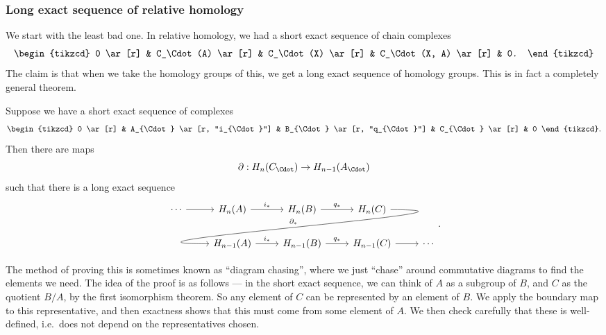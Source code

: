\documentclass[a4paper]{article}
\theoremstyle{definition}
\begin{document}
\subsubsection*{Long exact sequence of relative homology}
We start with the least bad one. In relative homology, we had a short exact sequence of chain complexes
\[
  \begin{tikzcd}
    0 \ar[r] & C_\Cdot(A) \ar[r] & C_\Cdot(X) \ar[r] & C_\Cdot(X, A) \ar[r] & 0.
  \end{tikzcd}
\]
The claim is that when we take the homology groups of this, we get a long exact sequence of homology groups. This is in fact a completely general theorem.
\begin{thm}
  Suppose we have a short exact sequence of complexes
  \[
    \begin{tikzcd}
      0 \ar[r] & A_{\Cdot} \ar [r, "i_{\Cdot}"] & B_{\Cdot} \ar [r, "q_{\Cdot}"] & C_{\Cdot} \ar[r] & 0
    \end{tikzcd}.
  \]
  Then there are maps
  \[
    \partial: H_n(C_{\Cdot}) \to H_{n - 1}(A_{\Cdot})
  \]
  such that there is a long exact sequence
  \[
    \begin{tikzcd}
      \cdots \ar [r] & H_n(A) \ar[r, "i_*"] & H_n(B) \ar[r, "q_*"] & H_n(C) \ar[out=0, in=180, looseness=2, overlay, dll, "\partial_*"']\\
      & H_{n - 1}(A) \ar[r, "i_*"] & H_{n - 1}(B) \ar[r, "q_*"] & H_{n - 1}(C) \ar [r] & \cdots
    \end{tikzcd}.
  \]
\end{thm}
The method of proving this is sometimes known as ``diagram chasing'', where we just ``chase'' around commutative diagrams to find the elements we need. The idea of the proof is as follows --- in the short exact sequence, we can think of $A$ as a subgroup of $B$, and $C$ as the quotient $B/A$, by the first isomorphism theorem. So any element of $C$ can be represented by an element of $B$. We apply the boundary map to this representative, and then exactness shows that this must come from some element of $A$. We then check carefully that these is well-defined, i.e.\ does not depend on the representatives chosen.
\end{document}
